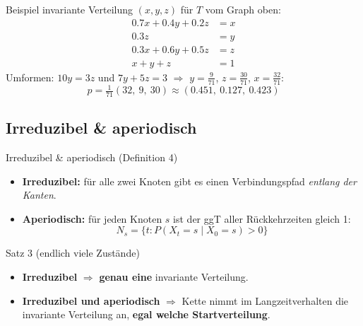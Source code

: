 \documentclass[a4paper, fontsize=7pt]{scrartcl}
\begin{document}
\begin{subbox}{Beispiel invariante Verteilung}
$(x, y, z)$ für $T$ vom Graph oben:
\begin{align*}
0.7x + 0.4y + 0.2z &= x\\
0.3z &= y\\
0.3x + 0.6y + 0.5z &= z\\
x + y + z &= 1
\end{align*}
Umformen: $10y = 3z$ und $7y + 5z = 3$
$\Rightarrow$ $y = \frac{9}{71}$, $z = \frac{30}{71}$, $x = \frac{32}{71}$:
$$\boxed{p = \tfrac{1}{71}(32,\ 9,\ 30)} \approx (0.451,\ 0.127,\ 0.423)$$
\end{subbox}

\subsection{Irreduzibel \& aperiodisch}

\begin{mainbox}{Irreduzibel \& aperiodisch (Definition 4)}
\begin{itemize}
    \item \textbf{Irreduzibel:} für alle zwei Knoten gibt es einen Verbindungspfad
          \emph{entlang der Kanten}.
    \item \textbf{Aperiodisch:} für jeden Knoten $s$ ist der ggT aller
          Rückkehrzeiten gleich 1:
          $$N_s = \{t : P(X_t = s \mid X_0 = s) > 0\}$$
\end{itemize}
\end{mainbox}

\begin{mainbox}{Satz 3 (endlich viele Zustände)}
\begin{itemize}
    \item \textbf{Irreduzibel} $\Rightarrow$ \textbf{genau eine} invariante
          Verteilung.
    \item \textbf{Irreduzibel und aperiodisch} $\Rightarrow$ Kette nimmt im
          Langzeitverhalten die invariante Verteilung an, \textbf{egal welche
          Startverteilung}.
\end{itemize}
\end{mainbox}
\end{document}
